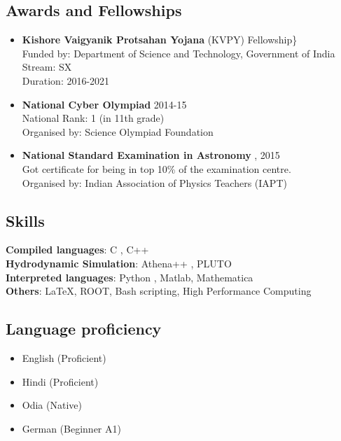 \documentclass[
  a4paper,
  11pt,
  oneside]{article}
\providecommand{\tightlist}{%
  \setlength{\itemsep}{0pt}\setlength{\parskip}{0pt}}\usepackage{longtable,booktabs,array}
\begin{document}
\hypertarget{awards-and-fellowships}{%
\subsection{Awards and Fellowships}\label{awards-and-fellowships}}

\begin{itemize}
\item
  \textbf{Kishore Vaigyanik Protsahan Yojana} (KVPY) Fellowship\}\\
  Funded by: Department of Science and Technology, Government of India\\
  Stream: SX\\
  Duration: 2016-2021
\item
  \textbf{National Cyber Olympiad} 2014-15\\
  National Rank: 1 (in 11th grade)\\
  Organised by: Science Olympiad Foundation
\item
  \textbf{National Standard Examination in Astronomy} , 2015\\
  Got certificate for being in top 10\% of the examination centre.\\
  Organised by: Indian Association of Physics Teachers (IAPT)
\end{itemize}

\hypertarget{skills}{%
\subsection{Skills}\label{skills}}

\textbf{Compiled languages}: C , C++\\
\textbf{Hydrodynamic Simulation}: Athena++ , PLUTO\\
\textbf{Interpreted languages}: Python , Matlab, Mathematica\\
\textbf{Others}: LaTeX, ROOT, Bash scripting, High Performance Computing

\hypertarget{language-proficiency}{%
\subsection{Language proficiency}\label{language-proficiency}}

\begin{itemize}
\tightlist
\item
  English (Proficient)
\item
  Hindi (Proficient)
\item
  Odia (Native)
\item
  German (Beginner A1)
\end{itemize}
\end{document}
